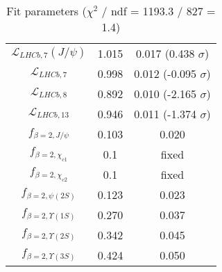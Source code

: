 \begin{table}[h!]
\begin{tabular}{c|c|c}
$\mathcal L_{LHCb,7}(J/\psi)$ & 1.015 & 0.017 (0.438 $\sigma$) \\
$\mathcal L_{LHCb,7}$ & 0.998 & 0.012 (-0.095 $\sigma$) \\
$\mathcal L_{LHCb,8}$ & 0.892 & 0.010 (-2.165 $\sigma$) \\
$\mathcal L_{LHCb,13}$ & 0.946 & 0.011 (-1.374 $\sigma$) \\
$f_{\beta=2,J/\psi}$ & 0.103 & 0.020 \\
$f_{\beta=2,\chi_{c1}}$ & 0.1 & fixed \\
$f_{\beta=2,\chi_{c2}}$ & 0.1 & fixed \\
$f_{\beta=2,\psi(2S)}$ & 0.123 & 0.023 \\
$f_{\beta=2,\Upsilon(1S)}$ & 0.270 & 0.037 \\
$f_{\beta=2,\Upsilon(2S)}$ & 0.342 & 0.045 \\
$f_{\beta=2,\Upsilon(3S)}$ & 0.424 & 0.050 \\
\end{tabular}
\caption{Fit parameters ($\chi^2$ / ndf = 1193.3 / 827 = 1.4)}
\end{table}
